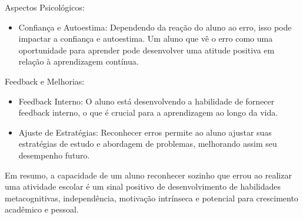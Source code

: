 Aspectos Psicológicos:

\begin{itemize}
    \item Confiança e Autoestima: Dependendo da reação do aluno ao erro, isso pode impactar a confiança e autoestima. Um aluno que vê o erro como uma oportunidade para aprender pode desenvolver uma atitude positiva em relação à aprendizagem contínua.
\end{itemize}

Feedback e Melhorias:

\begin{itemize}
    \item Feedback Interno: O aluno está desenvolvendo a habilidade de fornecer feedback interno, o que é crucial para a aprendizagem ao longo da vida.
    \item Ajuste de Estratégias: Reconhecer erros permite ao aluno ajustar suas estratégias de estudo e abordagem de problemas, melhorando assim seu desempenho futuro.
\end{itemize}

Em resumo, a capacidade de um aluno reconhecer sozinho que errou ao realizar uma atividade escolar é um sinal positivo de desenvolvimento de habilidades metacognitivas, independência, motivação intrínseca e potencial para crescimento acadêmico e pessoal.


